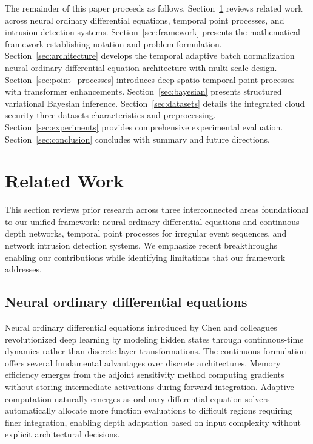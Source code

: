 \documentclass[10pt,journal,compsoc]{IEEEtran}
\begin{document}
The remainder of this paper proceeds as follows. Section~\ref{sec:related} reviews related work across neural ordinary differential equations, temporal point processes, and intrusion detection systems. Section~\ref{sec:framework} presents the mathematical framework establishing notation and problem formulation. Section~\ref{sec:architecture} develops the temporal adaptive batch normalization neural ordinary differential equation architecture with multi-scale design. Section~\ref{sec:point_processes} introduces deep spatio-temporal point processes with transformer enhancements. Section~\ref{sec:bayesian} presents structured variational Bayesian inference. Section~\ref{sec:datasets} details the integrated cloud security three datasets characteristics and preprocessing. Section~\ref{sec:experiments} provides comprehensive experimental evaluation. Section~\ref{sec:conclusion} concludes with summary and future directions.

\section{Related Work}
\label{sec:related}

This section reviews prior research across three interconnected areas foundational to our unified framework: neural ordinary differential equations and continuous-depth networks, temporal point processes for irregular event sequences, and network intrusion detection systems. We emphasize recent breakthroughs enabling our contributions while identifying limitations that our framework addresses.

\subsection{Neural ordinary differential equations}

Neural ordinary differential equations introduced by Chen and colleagues revolutionized deep learning by modeling hidden states through continuous-time dynamics rather than discrete layer transformations. The continuous formulation offers several fundamental advantages over discrete architectures. Memory efficiency emerges from the adjoint sensitivity method computing gradients without storing intermediate activations during forward integration. Adaptive computation naturally emerges as ordinary differential equation solvers automatically allocate more function evaluations to difficult regions requiring finer integration, enabling depth adaptation based on input complexity without explicit architectural decisions.
\end{document}
